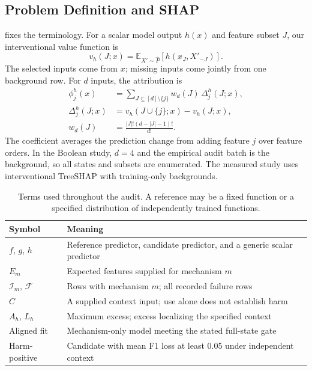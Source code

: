 \documentclass[conference]{IEEEtran}
\begin{document}
\subsection{Problem Definition and SHAP}
 fixes the terminology. For a scalar model output $h(x)$ and feature subset $J$, our interventional value function is
\begin{equation}
 v_h(J;x)=\mathbb E_{X'\sim\widehat P}[h(x_J,X'_{-J})].
 \label{eq:background}
\end{equation}
The selected inputs come from $x$; missing inputs come jointly from one background row. For $d$ inputs, the attribution is
\begin{align}
 \phi_j^h(x)&=\sum_{J\subseteq[d]\setminus\{j\}}w_d(J)\,\Delta_j^h(J;x),\label{eq:shap}\\
 \Delta_j^h(J;x)&=v_h(J\cup\{j\};x)-v_h(J;x),\\
 w_d(J)&=\frac{|J|!(d-|J|-1)!}{d!}.
\end{align}
The coefficient averages the prediction change from adding feature $j$ over feature orders. In the Boolean study, $d=4$ and the empirical audit batch is the background, so all states and subsets are enumerated. The measured study uses interventional TreeSHAP with training-only backgrounds.

\begin{table}[t]
\centering
\caption{Terms used throughout the audit. A reference may be a fixed function or a specified distribution of independently trained functions.}
\label{tab:notation}
\footnotesize
\begin{tabular}{L{0.14\columnwidth}L{0.76\columnwidth}}
\toprule
Symbol & Meaning \\
\midrule
$f$, $g$, $h$ & Reference predictor, candidate predictor, and a generic scalar predictor \\
$E_m$ & Expected features supplied for mechanism $m$ \\
$\mathcal I_m$, $\mathcal F$ & Rows with mechanism $m$; all recorded failure rows \\
$C$ & A supplied context input; use alone does not establish harm \\
$A_h$, $L_h$ & Maximum excess; excess localizing the specified context \\
Aligned fit & Mechanism-only model meeting the stated full-state gate \\
Harm-positive & Candidate with mean F1 loss at least 0.05 under independent context \\
\bottomrule
\end{tabular}
\end{table}
\end{document}

